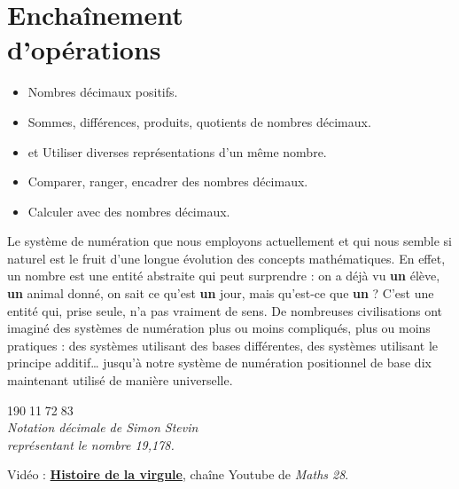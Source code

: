 \themaN
\graphicspath{{../../S01_Enchainement_operations/Images/}}

\chapter{Enchaînement\\d'opérations}
\label{S01}

\begin{prerequis}
   \begin{itemize}
      \item Nombres décimaux positifs.
      \item Sommes, différences, produits, quotients de nombres décimaux.
      \item et \com{} Utiliser diverses représentations d'un même nombre.
      \item[\com] Comparer, ranger, encadrer des nombres décimaux.
      \item[\com] Calculer avec des nombres décimaux.
   \end{itemize}
\end{prerequis}

\vfill

\begin{debat}
   Le système de numération que nous employons actuellement et qui nous semble si naturel est le fruit d'une longue évolution des concepts mathématiques. En effet, un nombre est une entité abstraite qui peut surprendre : on a déjà vu {\bf un} élève, {\bf un} animal donné, on sait ce qu'est {\bf un} jour, mais qu'est-ce que {\bf un} ? C'est une entité qui, prise seule, n'a pas vraiment de sens. De nombreuses civilisations ont imaginé des systèmes de numération plus ou moins compliqués, plus ou moins pratiques : des systèmes utilisant des bases différentes, des systèmes utilisant le principe additif\dots{} jusqu'à notre système de numération positionnel de base dix maintenant utilisé de manière universelle. \\
   \begin{center}
      \textcolor{B1}{{\huge 19\textcircled{\Large 0}1\textcircled{\Large 1}7\textcircled{\Large2}8\textcircled{\Large 3}} \\ [3mm]
      \it Notation décimale de Simon Stevin \\
      représentant le nombre 19,178.}
   \end{center}
   \bigskip
   \begin{cadre}[B2][F4]
      \begin{center}
         Vidéo : \href{https://www.youtube.com/watch?v=bkGMa1EJkSA}{\bf Histoire de la virgule}, chaîne Youtube de {\it Maths 28}.
      \end{center}
   \end{cadre}
\end{debat}

